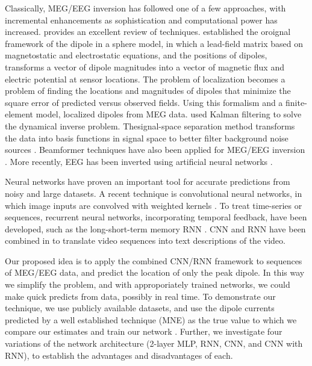 \documentclass[journal]{IEEEtran}
\begin{document}
Classically, MEG/EEG inversion has followed one of a few approaches, with incremental enhancements as sophistication and computational power has increased. \cite{grech2008review} provides an excellent review of techniques. \cite{mosher1992multiple} established the oroignal framework of the dipole in a sphere model, in which a lead-field matrix based on magnetostatic and electrostatic equations, and the positions of dipoles, transforms a vector of dipole magnitudes into a vector of magnetic flux and electric potential at sensor locations. The problem of localization becomes a problem of finding the locations and magnitudes of dipoles that minimize the square error of predicted versus observed fields. Using this formalism and a finite-element model, \cite{buchner1997inverse} localized dipoles from MEG data. \cite{galka2004solution} used Kalman filtering to solve the dynamical inverse problem. Thesignal-space separation method transforms the data into basis functions in signal space to better filter background noise sources \cite{taulu2005applications}. Beamformer techniques have also been applied for MEG/EEG inversion \cite{sekihara2001reconstructing}. More recently, EEG has been inverted using artificial neural networks \cite{van2000eeg}.


Neural networks have proven an important tool for accurate predictions from noisy and large datasets. A recent technique is convolutional neural networks, in which image inputs are convolved with weighted kernels \cite{lecun1998gradient}. To treat time-series or sequences, recurrent neural networks, incorporating temporal feedback, have been developed, such as the long-short-term memory RNN \cite{hochreiter1997long}. CNN and RNN have been combined in \cite{venugopalan2014translating} to translate video sequences into text descriptions of the video.


Our proposed idea is to apply the combined CNN/RNN framework to sequences of MEG/EEG data, and predict the location of only the peak dipole. In this way we simplify the problem, and with approporiately trained networks, we could make quick predicts from data, possibly in real time. To demonstrate our technique, we use publicly available datasets, and use the dipole currents predicted by a well established technique (MNE) as the true value to which we compare our estimates and train our network \cite{gramfort2014mne}. Further, we investigate four variations of the network architecture (2-layer MLP, RNN, CNN, and CNN with RNN), to establish the advantages and disadvantages of each.
\end{document}
